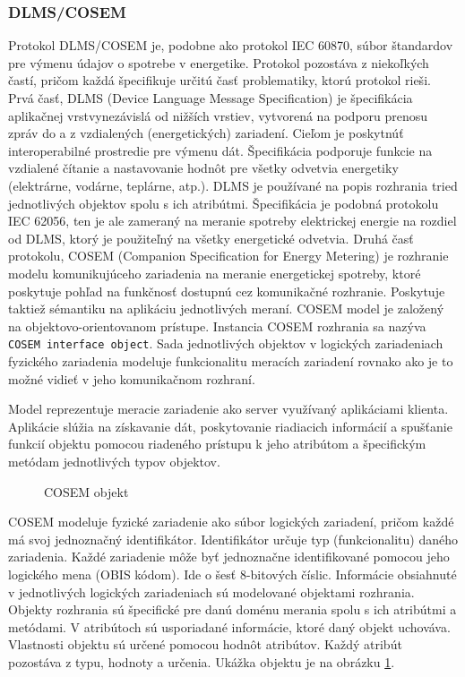 \subsubsection{DLMS/COSEM}
\tab Protokol DLMS/COSEM je, podobne ako protokol IEC 60870, súbor štandardov pre výmenu údajov o spotrebe v energetike. Protokol pozostáva z niekoľkých častí, pričom každá špecifikuje určitú časť problematiky, ktorú protokol rieši. Prvá časť, DLMS (Device Language Message Specification) je špecifikácia aplikačnej vrstvynezávislá od nižších vrstiev, vytvorená na podporu prenosu zpráv do a z vzdialených (energetických) zariadení. Cieľom je poskytnúť interoperabilné prostredie pre výmenu dát. Špecifikácia podporuje funkcie na vzdialené čítanie a nastavovanie hodnôt pre všetky odvetvia energetiky (elektrárne, vodárne, teplárne, atp.). DLMS je používané na popis rozhrania tried jednotlivých objektov spolu s ich atribútmi. Špecifikácia je podobná protokolu IEC 62056, ten je ale zameraný na meranie spotreby elektrickej energie na rozdiel od DLMS, ktorý je použiteľný na všetky energetické odvetvia. Druhá časť protokolu, COSEM (Companion Specification for Energy Metering) je rozhranie modelu komunikujúceho zariadenia na meranie energetickej spotreby, ktoré poskytuje pohľad na funkčnosť dostupnú cez komunikačné rozhranie. Poskytuje taktiež sémantiku na aplikáciu jednotlivých meraní. COSEM model je založený na objektovo-orientovanom prístupe. Instancia COSEM rozhrania sa nazýva {\tt COSEM interface object}. Sada jednotlivých objektov v logických zariadeniach fyzického zariadenia modeluje funkcionalitu meracích zariadení rovnako ako je to možné vidieť v jeho komunikačnom rozhraní\cite{dlmscosem}. \par
Model reprezentuje meracie zariadenie ako server využívaný aplikáciami klienta. Aplikácie slúžia na získavanie dát, poskytovanie riadiacich informácií a spušťanie funkcií objektu pomocou riadeného prístupu k jeho atribútom a špecifickým metódam jednotlivých typov objektov. \par
\begin{figure}[H]
    \centering
    \caption{COSEM objekt\cite{dlmscosem}}
\label{dlmsattribute}
\end{figure}
COSEM modeluje fyzické zariadenie ako súbor logických zariadení, pričom každé má svoj jednoznačný identifikátor. Identifikátor určuje typ (funkcionalitu) daného zariadenia. Každé zariadenie môže byť jednoznačne identifikované pomocou jeho logického mena (OBIS kódom). Ide o šesť 8-bitových číslic. Informácie obsiahnuté v jednotlivých logických zariadeniach sú modelované objektami rozhrania. Objekty rozhrania sú špecifické pre danú doménu merania spolu s ich atribútmi a metódami. V atribútoch sú usporiadané informácie, ktoré daný objekt uchováva. Vlastnosti objektu sú určené pomocou hodnôt atribútov. Každý atribút pozostáva z typu, hodnoty a určenia. Ukážka objektu je na obrázku \ref{dlmsattribute}. \par
